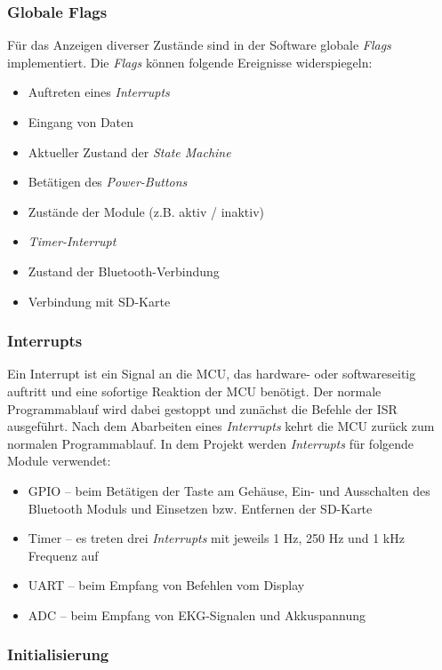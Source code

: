 \subsubsection{Globale Flags}

Für das Anzeigen diverser Zustände sind in der Software globale \textit{Flags} implementiert. Die \textit{Flags} können folgende Ereignisse widerspiegeln:
\begin{itemize}
    \item Auftreten eines \textit{Interrupts}
    \item Eingang von Daten
    \item Aktueller Zustand der \textit{State Machine}
    \item Betätigen des \textit{Power-Buttons}
    \item Zustände der Module (z.B. aktiv / inaktiv)
    \item \textit{Timer-Interrupt}
    \item Zustand der Bluetooth-Verbindung
    \item Verbindung mit SD-Karte
\end{itemize} 

\subsubsection{Interrupts}

Ein Interrupt ist ein Signal an die MCU, das hardware- oder softwareseitig auftritt und eine sofortige Reaktion der MCU benötigt. Der normale Programmablauf wird dabei gestoppt und zunächst die Befehle der ISR ausgeführt. Nach dem Abarbeiten eines \textit{Interrupts} kehrt die MCU zurück zum normalen Programmablauf.
In dem Projekt werden \textit{Interrupts} für folgende Module verwendet:
\begin{itemize}
    \item GPIO – beim Betätigen der Taste am Gehäuse, Ein- und Ausschalten des Bluetooth Moduls und Einsetzen bzw. Entfernen der SD-Karte
    \item Timer – es treten drei \textit{Interrupts} mit jeweils 1 Hz, 250 Hz und 1 kHz Frequenz auf
    \item UART – beim Empfang von Befehlen vom Display
    \item ADC – beim Empfang von EKG-Signalen und Akkuspannung
\end{itemize} 

\subsubsection{Initialisierung}

